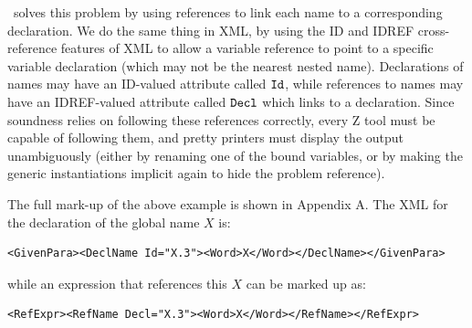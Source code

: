\documentclass{llncs}  %
\begin{document}
\CADiZ\ solves this problem by using references
to link each name to a corresponding declaration.
We do the same thing in XML, by using the ID and IDREF
cross-reference features of XML to allow a variable reference to point to
a specific variable declaration (which may not be the nearest nested
name).  Declarations of names may have an ID-valued attribute called
${\tt Id}$, while references to names may have an IDREF-valued attribute
called ${\tt Decl}$ which links to a declaration.  Since soundness relies
on following these references correctly, 
every Z tool must be capable of following them, and pretty printers must
display the output unambiguously (either by renaming one of the bound
variables, or by making the generic instantiations implicit again to hide
the problem reference).  

The full mark-up of the above example is shown in Appendix A.
The XML for the declaration of the global name $X$ is:
\begin{small}
\begin{verbatim}
<GivenPara><DeclName Id="X.3"><Word>X</Word></DeclName></GivenPara>
\end{verbatim}
\end{small}
while an expression that references this $X$ can be marked up as:
\begin{small}
\begin{verbatim}
<RefExpr><RefName Decl="X.3"><Word>X</Word></RefName></RefExpr>
\end{verbatim}
\end{small}

\end{document}
